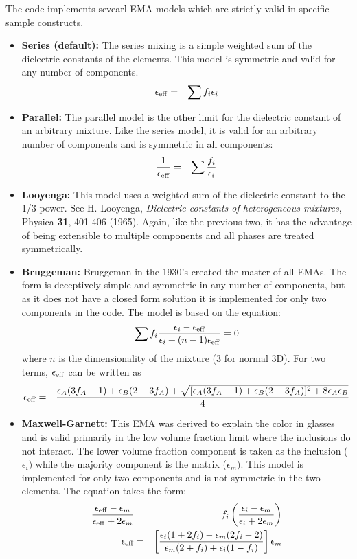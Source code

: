 \documentclass[10pt]{article}
\begin{document}
The code implements sevearl EMA models which are strictly valid in specific
sample constructs.
\begin{itemize}
\item {\bf Series (default):} The series mixing is a simple weighted sum of the
dielectric constants of the elements.  This model is symmetric and valid for any
number of components.
\begin{eqnarray*}
\epsilon_{\rm eff} &=& \sum f_i \epsilon_i
\end{eqnarray*}
\item {\bf Parallel:} The parallel model is the other limit for the dielectric
constant of an arbitrary mixture.  Like the series model, it is valid for an arbitrary
number of components and is symmetric in all components:
\begin{eqnarray*}
\frac{1}{\epsilon_{\rm eff}} &=& \sum \frac{f_i}{\epsilon_i}
\end{eqnarray*}
\item {\bf Looyenga:} This model uses a weighted sum of the dielectric constant to the
1/3 power.  See H. Looyenga, {\it Dielectric constants of heterogeneous mixtures}, Physica {\bf 31}, 401-406 (1965).
Again, like the previous two, it has the advantage of being extensible to multiple
components and all phases are treated symmetrically.
\item {\bf Bruggeman:} Bruggeman in the 1930's created the master of all EMAs.  The
form is deceptively simple and symmetric in any number of components, but as it does
not have a closed form solution it is implemented for only two components in the code.
The model is based on the equation:
\begin{eqnarray*}
\sum f_i \frac{\epsilon_i-\epsilon_{\rm eff}}{\epsilon_i+(n-1)\epsilon_{\rm eff}} = 0
\end{eqnarray*}
where $n$ is the dimensionality of the mixture (3 for normal 3D).  For two terms, $\epsilon_{\rm eff}$
can be written as
\begin{eqnarray*}
\epsilon_{\rm eff} &=& \frac{\epsilon_A(3f_A-1)+\epsilon_B(2-3f_A) + \sqrt{[\epsilon_A(3f_A-1)+\epsilon_B(2-3f_A)]^2+8\epsilon_A\epsilon_B}}{4}
\end{eqnarray*}
\item {\bf Maxwell-Garnett:} This EMA was derived to explain the color in glasses and is valid primarily
in the low volume fraction limit where the inclusions do not interact.  The lower volume fraction component
is taken as the inclusion ($\epsilon_i)$ while the majority component is the matrix ($\epsilon_m)$.  This model is
implemented for only two components and is not symmetric in the two elements.  The equation takes the form:
\begin{eqnarray*}
\frac{\epsilon_{\rm eff}-\epsilon_m}{\epsilon_{\rm eff}+2\epsilon_m} &=& f_i \left ( \frac{\epsilon_i-\epsilon_m}{\epsilon_i+2\epsilon_m} \right ) \\
\epsilon_{\rm eff} &=& \left [ \frac{\epsilon_i(1+2f_i) - \epsilon_m(2f_i-2)}{\epsilon_m(2+f_i)+\epsilon_i(1-f_i)} \right ]\epsilon_m
\end{eqnarray*}
\end{itemize}
\end{document}
